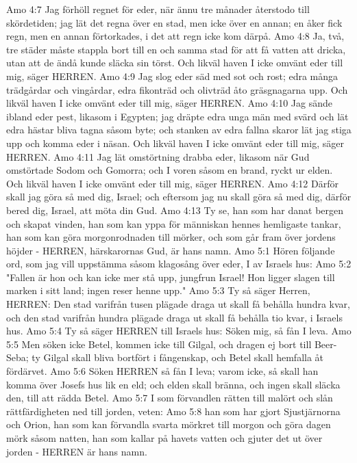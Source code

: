 Amo 4:7  Jag förhöll regnet för eder, när ännu tre månader återstodo till skördetiden; jag lät det regna över en stad, men icke över en annan; en åker fick regn, men en annan förtorkades, i det att regn icke kom därpå.
Amo 4:8  Ja, två, tre städer måste stappla bort till en och samma stad för att få vatten att dricka, utan att de ändå kunde släcka sin törst. Och likväl haven I icke omvänt eder till mig, säger HERREN.
Amo 4:9  Jag slog eder säd med sot och rost; edra många trädgårdar och vingårdar, edra fikonträd och olivträd åto gräsgnagarna upp. Och likväl haven I icke omvänt eder till mig, säger HERREN.
Amo 4:10  Jag sände ibland eder pest, likasom i Egypten; jag dräpte edra unga män med svärd och lät edra hästar bliva tagna såsom byte; och stanken av edra fallna skaror lät jag stiga upp och komma eder i näsan. Och likväl haven I icke omvänt eder till mig, säger HERREN.
Amo 4:11  Jag lät omstörtning drabba eder, likasom när Gud omstörtade Sodom och Gomorra; och I voren såsom en brand, ryckt ur elden. Och likväl haven I icke omvänt eder till mig, säger HERREN.
Amo 4:12  Därför skall jag göra så med dig, Israel; och eftersom jag nu skall göra så med dig, därför bered dig, Israel, att möta din Gud.
Amo 4:13  Ty se, han som har danat bergen och skapat vinden, han som kan yppa för människan hennes hemligaste tankar, han som kan göra morgonrodnaden till mörker, och som går fram över jordens höjder - HERREN, härskarornas Gud, är hans namn.
Amo 5:1  Hören följande ord, som jag vill uppstämma såsom klagosång över eder, I av Israels hus:
Amo 5:2  "Fallen är hon och kan icke mer stå upp, jungfrun Israel! Hon ligger slagen till marken i sitt land; ingen reser henne upp."
Amo 5:3  Ty så säger Herren, HERREN: Den stad varifrån tusen plägade draga ut skall få behålla hundra kvar, och den stad varifrån hundra plägade draga ut skall få behålla tio kvar, i Israels hus.
Amo 5:4  Ty så säger HERREN till Israels hus: Söken mig, så fån I leva.
Amo 5:5  Men söken icke Betel, kommen icke till Gilgal, och dragen ej bort till Beer-Seba; ty Gilgal skall bliva bortfört i fångenskap, och Betel skall hemfalla åt fördärvet.
Amo 5:6  Söken HERREN så fån I leva; varom icke, så skall han komma över Josefs hus lik en eld; och elden skall bränna, och ingen skall släcka den, till att rädda Betel.
Amo 5:7  I som förvandlen rätten till malört och slån rättfärdigheten ned till jorden, veten:
Amo 5:8  han som har gjort Sjustjärnorna och Orion, han som kan förvandla svarta mörkret till morgon och göra dagen mörk såsom natten, han som kallar på havets vatten och gjuter det ut över jorden - HERREN är hans namn.
